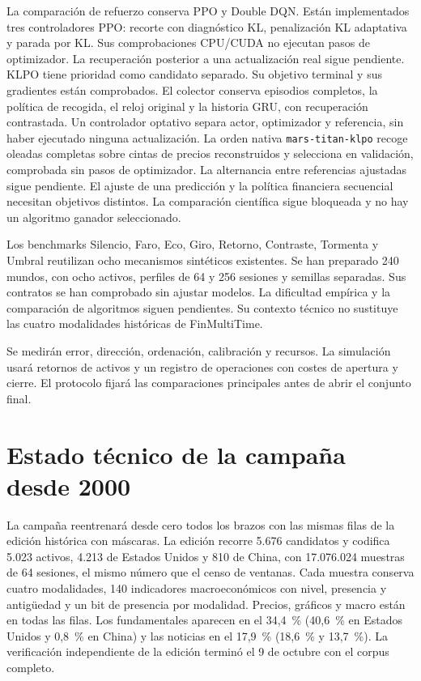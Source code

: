 \documentclass[11pt,a4paper]{report}
\begin{document}
La comparación de refuerzo conserva PPO y Double DQN. Están implementados tres
controladores PPO: recorte con diagnóstico KL, penalización KL adaptativa y
parada por KL. Sus comprobaciones CPU/CUDA no ejecutan pasos de optimizador.
La recuperación posterior a una actualización real sigue pendiente. KLPO tiene
prioridad como candidato separado. Su objetivo terminal y sus gradientes están
comprobados. El colector conserva episodios completos, la política de recogida,
el reloj original y la historia GRU, con recuperación contrastada. Un
controlador optativo separa actor, optimizador y referencia, sin haber
ejecutado ninguna actualización. La orden nativa \texttt{mars-titan-klpo}
recoge oleadas completas sobre cintas de precios reconstruidos y selecciona en
validación, comprobada sin pasos de optimizador. La alternancia entre referencias ajustadas
sigue pendiente.
El ajuste de una predicción y la política financiera secuencial necesitan
objetivos distintos. La comparación científica sigue bloqueada y no hay un
algoritmo ganador seleccionado.

Los benchmarks Silencio, Faro, Eco, Giro, Retorno, Contraste, Tormenta y Umbral
reutilizan ocho mecanismos sintéticos existentes. Se han preparado 240 mundos,
con ocho activos, perfiles de 64 y 256 sesiones y semillas separadas. Sus contratos
se han comprobado sin ajustar modelos. La dificultad empírica y la comparación
de algoritmos siguen pendientes. Su contexto técnico no sustituye las cuatro
modalidades históricas de FinMultiTime.

Se medirán error, dirección, ordenación, calibración y recursos. La simulación usará
retornos de activos y un registro de operaciones con costes de apertura y cierre.
El protocolo fijará las comparaciones principales antes de abrir el conjunto final.

\section{Estado técnico de la campaña desde 2000}
La campaña reentrenará desde cero todos los brazos con las mismas filas de la
edición histórica con máscaras. La edición recorre 5.676 candidatos y codifica
5.023 activos, 4.213 de Estados Unidos y 810 de China, con 17.076.024 muestras
de 64 sesiones, el mismo número que el censo de ventanas. Cada muestra conserva
cuatro modalidades, 140 indicadores macroeconómicos con nivel, presencia y
antigüedad y un bit de presencia por modalidad. Precios, gráficos y macro
están en todas las filas. Los fundamentales aparecen en el 34,4~\% (40,6~\% en
Estados Unidos y 0,8~\% en China) y las noticias en el 17,9~\% (18,6~\% y
13,7~\%). La verificación independiente de la edición terminó el 9 de octubre
con el corpus completo.
\end{document}
